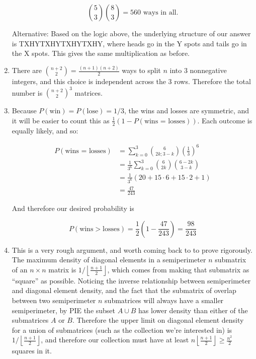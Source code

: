 \documentclass{book}
\numberwithin{equation}{section}
\begin{document}
\begin{enumerate}[label={9.\arabic*}]
$${5 \choose 3}{8 \choose 3} = 560 \text{ ways in all.}$$

Alternative: Based on the logic above, the underlying structure of our answer is TXHYTXHYTXHYTXHY,
where heads go in the Y spots and tails go in the X spots. This gives the same multiplication as before.

\item
There are ${n+2 \choose 2} = \frac{(n+1)(n+2)}{2}$ ways to split $n$ into 3 nonnegative integers, and this choice is
independent across the 3 rows. Therefore the total number is ${n+2 \choose 2}^3$ matrices.

\item
Because $P(\text{win}) = P(\text{lose}) = 1/3$, the wins and losses are symmetric, and it will be easier to count this
as $\frac{1}{2}(1 - P(\text{wins = losses}))$. Each outcome is equally likely, and so:

\begin{align*}
P(\text{wins = losses}) & = \sum_{k=0}^3 {6 \choose 2k; 3-k}\left(\frac{1}{3}\right)^6 \\
& = \frac{1}{3^6}\sum_{k=0}^3 {6 \choose 2k}{6 - 2k \choose 3-k} \\
& = \frac{1}{3^6}(20 + 15\cdot6 + 15\cdot2 + 1) \\
& = \frac{47}{243}
\end{align*}

And therefore our desired probability is

$$P(\text{wins}>\text{losses}) = \frac{1}{2}\left(1 - \frac{47}{243}\right) = \frac{98}{243}$$

\item
This is a very rough argument, and worth coming back to to prove rigorously. The maximum density of diagonal elements
in a semiperimeter $n$ submatrix of an $n \times n$ matrix is $1/\left\lfloor\frac{n+1}{2}\right\rfloor$, which comes
from making that submatrix as ``square'' as possible. Noticing the inverse relationship between semiperimeter
and diagonal element density, and the fact that the submatrix of overlap between two semiperimeter $n$ submatrices
will always have a smaller semiperimeter, by PIE the subset $A \cup B$ has lower density than either of the submatrices
$A$ or $B$. Therefore the upper limit on diagonal element density for a union of submatrices (such as the collection
we're interested in) is $1/\left\lfloor\frac{n+1}{2}\right\rfloor$, and therefore our collection must have at least
$n\left\lfloor\frac{n+1}{2}\right\rfloor \geq \frac{n^2}{2}$ squares in it.


\end{enumerate}
\end{document}
